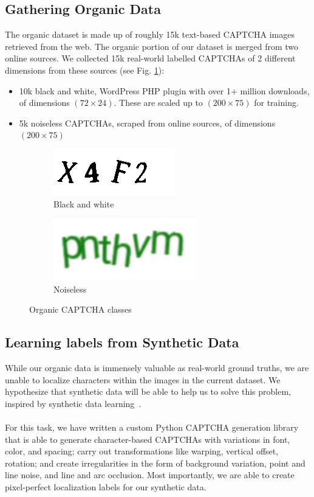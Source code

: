 \documentclass[twocolumn,10pt]{article}
\begin{document}
\subsection{Gathering Organic Data}
The organic dataset is made up of roughly 15k text-based CAPTCHA images retrieved from the web. The organic portion of our dataset is merged from two online sources. We collected 15k real-world labelled CAPTCHAs of 2 different dimensions from these sources (see Fig. \ref{fig:organic}):
\begin{itemize}
\item 10k black and white, WordPress PHP plugin with over 1+ million downloads, of dimensions $(72 \times 24)$. These are scaled up to $(200 \times 75)$ for training.
\item 5k noiseless CAPTCHAs, scraped from online sources, of dimensions $(200 \times 75)$
\end{itemize}

\begin{center}
\begin{figure}
\centering
\begin{subfigure}{.4\columnwidth}
  \centering
  \includegraphics[width=.4\linewidth]{8908_X4F2.png}
  \caption{Black and white}
\end{subfigure}
\begin{subfigure}{.5\columnwidth}
  \centering
  \includegraphics[width=.4\linewidth]{noiseless.png}
  \caption{Noiseless}
\end{subfigure}
\caption{Organic CAPTCHA classes}
\label{fig:organic}
\end{figure}
\end{center}

\subsection{Learning labels from Synthetic Data}
While our organic data is immensely valuable as real-world ground truths, we are unable to localize characters within the images in the current dataset. We hypothesize that synthetic data will be able to help us to solve this problem, inspired by synthetic data learning~\cite{synth}.
\\\\
For this task, we have written a custom Python CAPTCHA generation library that is able to generate character-based CAPTCHAs with variations in font, color, and spacing; carry out transformations like warping, vertical offset, rotation; and create irregularities in the form of background variation, point and line noise, and line and arc occlusion. Most importantly, we are able to create pixel-perfect localization labels for our synthetic data.
\end{document}
